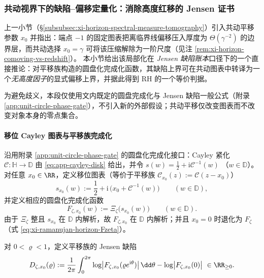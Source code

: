 \subsubsection{共动视界下的缺陷--偏移定量化：消除高度红移的 Jensen 证书}\label{subsubsec:xi-comoving-defect-delta-bound}
上一小节（\S\ref{subsubsec:xi-horizon-spectral-measure-tomography}）引入共动平移参数 \(x_0\) 并指出：端点 \(-1\) 的固定图表把离临界线偏移压入厚度为 \(\Theta(\gamma^{-2})\) 的边界层，而共动选择 \(x_0=\gamma\) 可将该压缩解除为一阶尺度（见注 \ref{rem:xi-horizon-comoving-vs-redshift}）。
本小节给出该局部化在 \emph{Jensen 缺陷账本}口径下的一个直接推论：对平移族构造的圆盘化完成化函数，其缺陷上界可在共动图表中转译为一个\emph{无高度因子}的显式偏移上界，并据此得到 RH 的一个等价判据。
\par
为避免歧义，本段仅使用文内既定的圆盘完成化与 Jensen 缺陷一般公式（附录 \ref{app:unit-circle-phase-gate}），不引入新的外部假设；共动平移仅改变图表而不改变对象本身的零点集合。

\paragraph{移位 Cayley 图表与平移族完成化}
沿用附录 \ref{app:unit-circle-phase-gate} 的圆盘化完成化接口：Cayley 紧化 \(\mathcal{C}:\mathbb{H}\to\mathbb{D}\) 由 \eqref{eq:app-cayley-disk} 给出，并令
\(
s(w)=\tfrac12+\mathrm{i}\mathcal{C}^{-1}(w)
\)
（\(w\in\mathbb{D}\)）。
对任意 \(x_0\in\RR\)，定义移位图表（等价于平移族 \(\mathcal{C}_{x_0}(z):=\mathcal{C}(z-x_0)\)）
\begin{equation}\label{eq:xi-comoving-shifted-s}
s_{x_0}(w):=\frac12+\mathrm{i}\,\bigl(x_0+\mathcal{C}^{-1}(w)\bigr)\qquad(w\in\mathbb{D}),
\end{equation}
并定义相应的圆盘化完成化函数
\begin{equation}\label{eq:xi-comoving-shifted-Fzeta}
F_{\zeta,x_0}(w):=\Xi_{\zeta}\!\bigl(s_{x_0}(w)\bigr)\qquad(w\in\mathbb{D}).
\end{equation}
由于 \(\Xi_{\zeta}\) 整且 \(s_{x_0}\) 在 \(\mathbb{D}\) 内解析，故 \(F_{\zeta,x_0}\) 在 \(\mathbb{D}\) 内解析；并且 \(x_0=0\) 时退化为 \(F_{\zeta}\)（式 \eqref{eq:xi-ramanujan-horizon-Fzeta}）。
\par
对 \(0<\varrho<1\)，定义平移族的 Jensen 缺陷
\begin{equation}\label{eq:xi-comoving-shifted-jensen-defect}
D_{\zeta,x_0}(\varrho)
:=\frac{1}{2\pi}\int_{0}^{2\pi}\log\bigl|F_{\zeta,x_0}(\varrho e^{\mathrm{i}\theta})\bigr|\,\dd\theta-\log\bigl|F_{\zeta,x_0}(0)\bigr|\ \in\RR_{\ge 0}.
\end{equation}

